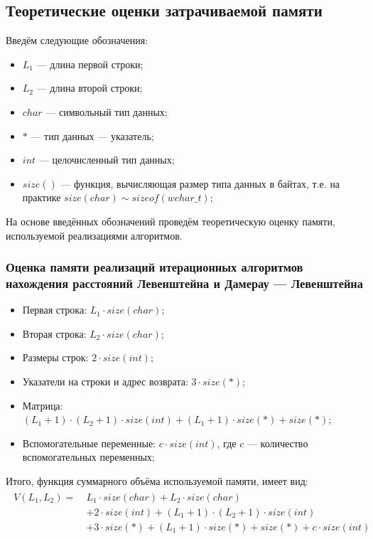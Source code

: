 
\newpage

\subsection{Теоретические оценки затрачиваемой памяти}

Введём следующие обозначения:
\begin{itemize}
    \item $L_1$ --- длина первой строки;
    \item $L_2$ --- длина второй строки;
    \item $char$ --- символьный тип данных;
    \item $*$ --- тип данных --- указатель;
    \item $int$ --- целочисленный тип данных;
    \item $size()$ --- функция, вычисляющая размер типа данных в байтах, т.е. на практике $size(char) \sim sizeof(wchar\_t)$;
\end{itemize}

На основе введённых обозначений проведём теоретическую оценку памяти, используемой реализациями алгоритмов.

\subsubsection{Оценка памяти реализаций итерационных алгоритмов нахождения расстояний Левенштейна и Дамерау --- Левенштейна}
\begin{itemize}
    \item Первая строка: $L_1 \cdot size(char)$;
    \item Вторая строка: $L_2 \cdot size(char)$;
    \item Размеры строк: $2 \cdot size(int)$;
    \item Указатели на строки и адрес возврата: $3 \cdot size(*)$;
    \item Матрица: $(L_1 + 1) \cdot (L_2 + 1) \cdot size(int) + (L_1 + 1) \cdot size(*) + size(*)$;
    \item Вспомогательные переменные: $c \cdot size(int)$, где $c$ --- количество вспомогательных переменных;
\end{itemize}

Итого, функция суммарного объёма используемой памяти, имеет вид:
\begin{multline}
\begin{aligned}
V(L_1,L_2) =\ &L_1 \cdot size(char) + L_2 \cdot size(char) \\
&+ 2 \cdot size(int) + (L_1 + 1) \cdot (L_2 + 1) \cdot size(int) \\
&+ 3 \cdot size(*) + (L_1 + 1) \cdot size(*) + size(*) + c \cdot size(int)
\end{aligned}
\end{multline}

